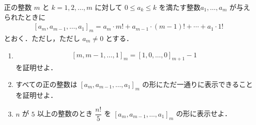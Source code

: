 \documentclass[../../main.tex]{subfiles}
\begin{document}
正の整数 $m$ と $k = 1, 2, \dots, m$ に対して $0 \leq a_k \leq k$ を満たす整数$a_1, \dots, a_m$ が与えられたときに
\begin{align}
  \left[a_m, a_{m-1}, \dots, a_1\right]_m = a_m \cdot m! + a_{m-1} \cdot (m-1)! + \cdots + a_1 \cdot 1!
\end{align}
とおく．ただし，ただし $a_m \neq 0$ とする．
\begin{enumerate}
  \item
    \begin{align}
      \left[m, m-1, \dots, 1\right]_m = \left[1, 0, \dots, 0\right]_{m+1} - 1
    \end{align}
    を証明せよ．
  \item すべての正の整数は $\left[a_m, a_{m-1}, \dots, a_1\right]_m$ の形にただ一通りに表示できることを証明せよ．
  \item $n$ が $5$ 以上の整数のとき $\dfrac{n!}{5}$ を $\left[a_m, a_{m-1}, \dots, a_1\right]_m$ の形に表示せよ．
\end{enumerate}
\end{document}
